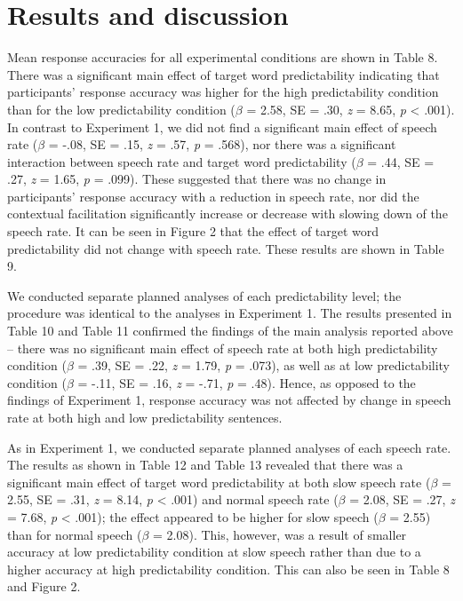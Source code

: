 \documentclass[a4paper, nobind]{templates/ociamthesis}
\begin{document}
\hypertarget{results-and-discussion-4}{%
\section{Results and discussion}\label{results-and-discussion-4}}

Mean response accuracies for all experimental conditions are shown in Table 8.
There was a significant main effect of target word predictability indicating that participants' response accuracy was higher for the high predictability condition than for the low predictability condition (\(\beta\) = 2.58, SE = .30, \emph{z} = 8.65, \emph{p} \textless{} .001).
In contrast to Experiment 1, we did not find a significant main effect of speech rate (\(\beta\) = -.08, SE = .15, \emph{z} = .57, \emph{p} = .568), nor there was a significant interaction between speech rate and target word predictability (\(\beta\) = .44, SE = .27, \emph{z} = 1.65, \emph{p} = .099).
These suggested that there was no change in participants' response accuracy with a reduction in speech rate, nor did the contextual facilitation significantly increase or decrease with slowing down of the speech rate.
It can be seen in Figure 2 that the effect of target word predictability did not change with speech rate.
These results are shown in Table 9.

We conducted separate planned analyses of each predictability level; the procedure was identical to the analyses in Experiment 1.
The results presented in Table 10 and Table 11 confirmed the findings of the main analysis reported above -- there was no significant main effect of speech rate at both high predictability condition (\(\beta\) = .39, SE = .22, \emph{z} = 1.79, \emph{p} = .073), as well as at low predictability condition (\(\beta\) = -.11, SE = .16, \emph{z} = -.71, \emph{p} = .48).
Hence, as opposed to the findings of Experiment 1, response accuracy was not affected by change in speech rate at both high and low predictability sentences.

As in Experiment 1, we conducted separate planned analyses of each speech rate.
The results as shown in Table 12 and Table 13 revealed that there was a significant main effect of target word predictability at both slow speech rate (\(\beta\) = 2.55, SE = .31, \emph{z} = 8.14, \emph{p} \textless{} .001) and normal speech rate (\(\beta\) = 2.08, SE = .27, \emph{z} = 7.68, \emph{p} \textless{} .001);
the effect appeared to be higher for slow speech (\(\beta\) = 2.55) than for normal speech (\(\beta\) = 2.08).
This, however, was a result of smaller accuracy at low predictability condition at slow speech rather than due to a higher accuracy at high predictability condition. This can also be seen in Table 8 and Figure 2.
\end{document}

